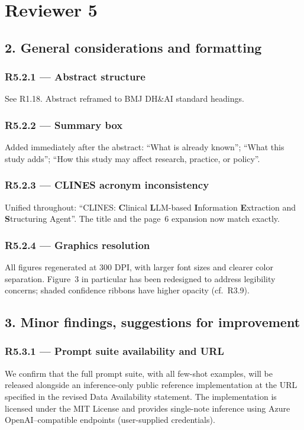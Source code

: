 \documentclass[11pt,letterpaper]{article}
\newcommand{\response}[1]{\par#1\par\medskip}
\begin{document}
\hrulefill

\section{Reviewer 5}

\subsection*{2. General considerations and formatting}

\subsubsection*{R5.2.1 --- Abstract structure}
\response{See R1.18. Abstract reframed to BMJ DH\&AI standard headings.}

\subsubsection*{R5.2.2 --- Summary box}
\response{Added immediately after the abstract: ``What is already known''; ``What this study adds''; ``How this study may affect research, practice, or policy''.}

\subsubsection*{R5.2.3 --- CLINES acronym inconsistency}
\response{Unified throughout: ``CLINES: \textbf{C}linical \textbf{L}LM-based \textbf{I}nformation \textbf{E}xtraction and \textbf{S}tructuring Agent''. The title and the page~6 expansion now match exactly.}

\subsubsection*{R5.2.4 --- Graphics resolution}
\response{All figures regenerated at 300 DPI, with larger font sizes and clearer color separation. Figure~3 in particular has been redesigned to address legibility concerns; shaded confidence ribbons have higher opacity (cf.\ R3.9).}

\subsection*{3. Minor findings, suggestions for improvement}

\subsubsection*{R5.3.1 --- Prompt suite availability and URL}
\response{We confirm that the full prompt suite, with all few-shot examples, will be released alongside an inference-only public reference implementation at the URL specified in the revised Data Availability statement. The implementation is licensed under the MIT License and provides single-note inference using Azure OpenAI--compatible endpoints (user-supplied credentials).}
\end{document}
